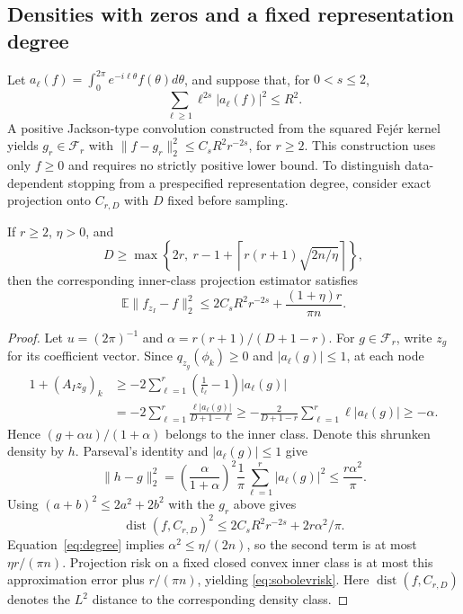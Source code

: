 \subsection{Densities with zeros and a fixed representation degree}
Let \(a_\ell(f)=\int_0^{2\pi}e^{-i\ell\theta}f(\theta)d\theta\), and suppose that, for \(0<s\le2\),
\begin{equation}\label{eq:sobolev}
\sum_{\ell\ge1}\ell^{2s}|a_\ell(f)|^2\le R^2.
\end{equation}
A positive Jackson-type convolution constructed from the squared Fejér kernel yields \(g_r\in\mathcal F_r\) with \(\|f-g_r\|_2^2\le C_sR^2r^{-2s}\), for \(r\ge2\). This construction uses only \(f\ge0\) and requires no strictly positive lower bound. To distinguish data-dependent stopping from a prespecified representation degree, consider exact projection onto \(C_{r,D}\) with \(D\) fixed before sampling.
\begin{proposition}\label{prop:sobolev}
If \(r\ge2\), \(\eta>0\), and
\begin{equation}\label{eq:degree}
D\ge\max\left\{2r,\ r-1+\left\lceil r(r+1)\sqrt{2n/\eta}\right\rceil\right\},
\end{equation}
then the corresponding inner-class projection estimator satisfies
\begin{equation}\label{eq:sobolevrisk}
\mathbb E\|f_{z_I}-f\|_2^2\le2C_sR^2r^{-2s}+\frac{(1+\eta)r}{\pi n}.
\end{equation}
\end{proposition}
\begin{proof}
Let \(u=(2\pi)^{-1}\) and \(\alpha=r(r+1)/(D+1-r)\). For \(g\in\mathcal F_r\), write \(z_g\) for its coefficient vector. Since \(q_{z_g}(\phi_k)\ge0\) and \(|a_\ell(g)|\le1\), at each node
\[
\begin{aligned}
1+(A_Iz_g)_k &\ge -2\sum_{\ell=1}^r\left(\frac1{t_\ell}-1\right)|a_\ell(g)|\\
&=-2\sum_{\ell=1}^r\frac{\ell|a_\ell(g)|}{D+1-\ell}
\ge-\frac{2}{D+1-r}\sum_{\ell=1}^r\ell|a_\ell(g)|\ge-\alpha.
\end{aligned}
\]
Hence \((g+\alpha u)/(1+\alpha)\) belongs to the inner class. Denote this shrunken density by \(h\). Parseval's identity and \(|a_\ell(g)|\le1\) give
\[
\|h-g\|_2^2=\left(\frac{\alpha}{1+\alpha}\right)^2
\frac1\pi\sum_{\ell=1}^{r}|a_\ell(g)|^2\le\frac{r\alpha^2}{\pi}.
\]
Using \((a+b)^2\le2a^2+2b^2\) with the \(g_r\) above gives
\[\operatorname{dist}(f,C_{r,D})^2\le2C_sR^2r^{-2s}+2r\alpha^2/\pi.\]
Equation~\eqref{eq:degree} implies \(\alpha^2\le\eta/(2n)\), so the second term is at most \(\eta r/(\pi n)\). Projection risk on a fixed closed convex inner class is at most this approximation error plus \(r/(\pi n)\), yielding \eqref{eq:sobolevrisk}. Here \(\operatorname{dist}(f,C_{r,D})\) denotes the \(L^2\) distance to the corresponding density class.
\end{proof}
